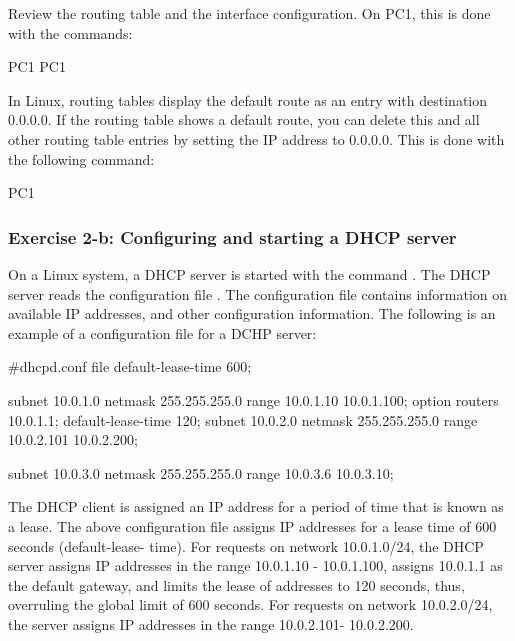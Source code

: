 Review the routing table and the interface configuration. On PC1, this is done with the commands:

\begin{cmdblock}
	PC1%
	PC1%
\end{cmdblock}

In Linux, routing tables display the default route as an entry with destination 0.0.0.0. If the routing table shows a default route, you can delete this and all other routing table entries by setting the IP address to 0.0.0.0. This is done with the following command:

\begin{cmdblock}
	PC1%
\end{cmdblock}

\subsubsection{Exercise 2-b: Configuring and starting a DHCP server}
On a Linux system, a DHCP server is started with the command . The DHCP server reads the configuration file . The configuration file contains information on available IP addresses, and other configuration information. The following is an example of a configuration file for a DCHP server:

\begin{cmdblock}
	#dhcpd.conf file
	default-lease-time 600;

	subnet 10.0.1.0 netmask 255.255.255.0 {
		range 10.0.1.10 10.0.1.100; 
		option routers 10.0.1.1; 
		default-lease-time 120;
	}
	subnet 10.0.2.0 netmask 255.255.255.0 {
		range 10.0.2.101 10.0.2.200; 
	}

	subnet 10.0.3.0 netmask 255.255.255.0 { 
		range 10.0.3.6 10.0.3.10;
	}
\end{cmdblock}

The DHCP client is assigned an IP address for a period of time that is known as a lease. The above configuration file assigns IP addresses for a lease time of 600 seconds (default-lease- time). For requests on network 10.0.1.0/24, the DHCP server assigns IP addresses in the range 10.0.1.10 - 10.0.1.100, assigns 10.0.1.1 as the default gateway, and limits the lease of addresses to 120 seconds, thus, overruling the global limit of 600 seconds. For requests on network 10.0.2.0/24, the server assigns IP addresses in the range 10.0.2.101- 10.0.2.200.

